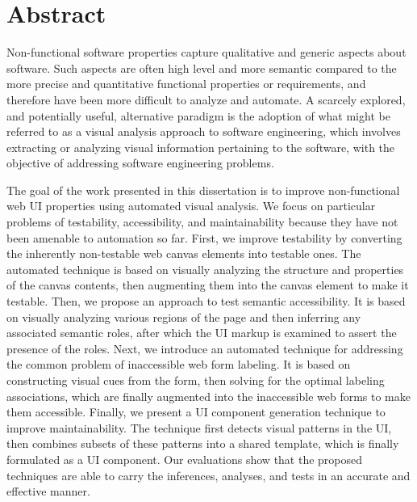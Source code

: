
\chapter{Abstract}

Non-functional software properties capture qualitative and generic aspects about software. 
Such aspects are often high level and more semantic compared to the more precise and quantitative functional properties or requirements, and therefore have been more difficult 
to analyze and automate.  
A scarcely explored, and potentially useful, alternative 
paradigm is the adoption of what might be referred to as a visual analysis 
approach to software engineering, which involves extracting or analyzing 
visual information pertaining to the software, with the 
objective of addressing software engineering problems.  

The goal of the work presented in this dissertation is to improve 
non-functional web UI properties using automated visual analysis. 
We focus on particular problems of testability, accessibility, and maintainability 
because they have not been amenable to automation so far.  
First, we improve testability by converting the inherently non-testable 
web canvas elements into testable ones. 
The automated technique is based on visually analyzing the structure and  
properties of the canvas contents, then augmenting them 
into the canvas element to make it testable. 
Then, we propose an approach to test semantic accessibility.
It is based on visually analyzing various regions of the page and then inferring 
any associated semantic roles, after which the UI markup is examined to 
assert the presence of the roles. 
Next, we introduce an automated technique for addressing the common problem 
of inaccessible web form labeling. 
It is based on constructing visual cues from the form, 
then solving for the optimal labeling associations, which are finally augmented 
into the inaccessible web forms to make them accessible. 
Finally, we present a UI component generation technique to improve maintainability. 
The technique first detects visual patterns in the UI, then combines subsets of these 
patterns into a shared template, which is finally formulated as a UI component.  
Our evaluations show that the proposed techniques are able to carry the inferences, 
analyses, and tests in an accurate and effective manner.  




